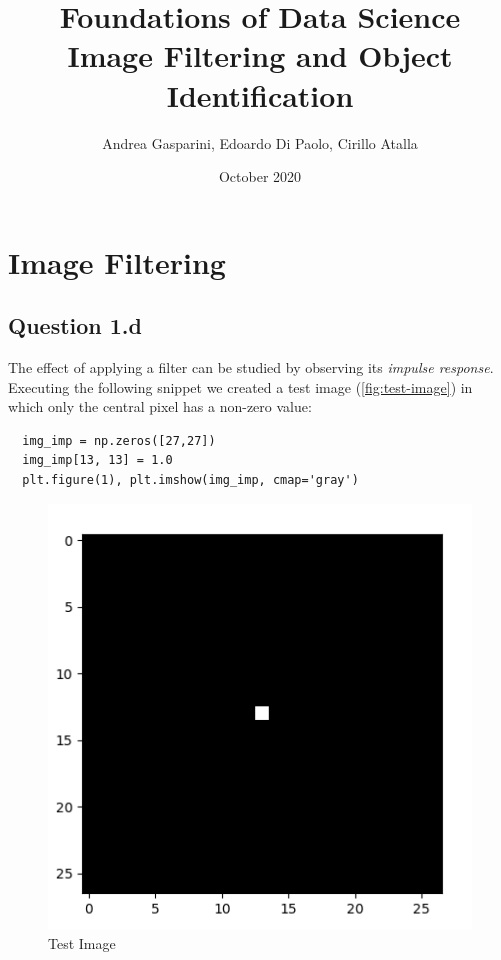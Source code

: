 \documentclass{article}
\title{Foundations of Data Science \\ Image Filtering and Object Identification}
\author{Andrea Gasparini, Edoardo Di Paolo, Cirillo Atalla}
\date{October 2020}
\begin{document}
\maketitle
{
  \hypersetup{linkcolor=black}
  \tableofcontents
}
\newpage

\section{Image Filtering}

\subsection{Question 1.d}
The effect of applying a filter can be studied by observing its \textit{impulse response}. Executing the following snippet we created a test image (\autoref{fig:test-image}) in which only the central pixel has a non-zero value:
\begin{verbatim}
  img_imp = np.zeros([27,27])
  img_imp[13, 13] = 1.0
  plt.figure(1), plt.imshow(img_imp, cmap='gray')
\end{verbatim}

\begin{figure}[ht]
    \centering
    \includegraphics[scale=0.4]{images/Q1.d-F1.png}
    \caption{Test Image}
    \label{fig:test-image}
\end{figure}
\end{document}
